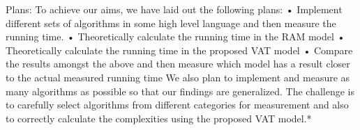 Plans:
To achieve our aims, we have laid out the following plans:
•  Implement different sets of algorithms in some high level language and then measure the running time.
•	Theoretically calculate the running time in the RAM model
•	Theoretically calculate the running time in the proposed VAT model
•	Compare the results amongst the above and then measure which model has a result closer to the actual measured running time
We also plan to implement and measure as many algorithms as possible so that our findings are generalized. The challenge is to carefully select algorithms from different categories for measurement and also to correctly calculate the complexities using the proposed VAT model.*
